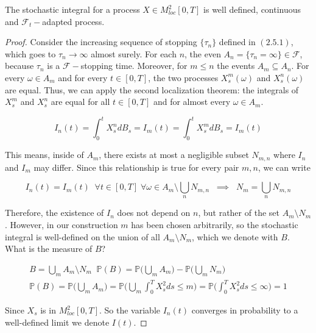 \begin{theorem}
    The stochastic integral for a process $X \in M^2_{loc}[0,T]$ is well defined, continuous and $\mathcal{F}_t-$adapted process. 
\end{theorem}
\begin{proof}
    Consider the increasing sequence of stopping $\{\tau_n \}$ defined in $(2.5.1)$, which goes to $\tau_n \to \infty$ almost surely. For each $n$, the even $A_n = \{ \tau_n = \infty \} \in \mathcal{F}$, because $\tau_n$ is a $\mathcal{F}-$stopping time. Moreover, for $m \leq n$ the events $A_m\subseteq A_n$. For every $\omega \in A_m$ and for every $t \in [0,T]$, the two processes $X_s^m(\omega)$ and $X_s^n(\omega)$ are equal. Thus, we can apply the second localization theorem: the integrals of $X_s^m$ and $X_s^n$ are equal for all $t \in [0,T]$ and for almost every $\omega \in A_m$. 

    \begin{equation*}
        I_n(t) = \int_0^t X_s^n dB_s = I_m(t) = \int_0^t X_s^m dB_s = I_m(t)
    \end{equation*}

    This means, inside of $A_m$, there exists at most a negligible subset $N_{m,n}$ where $I_n$ and $I_m$ may differ. Since this relationship is true for every pair $m,n$, we can write

    \begin{equation*}
        I_n(t) = I_m(t) \;\; \forall t \in [0,T] \; \forall \omega \in A_m \setminus \bigcup_n N_{m,n} \;\; \implies \;\; N_m = \bigcup_n N_{m,n}
    \end{equation*}

    Therefore, the existence of $I_n$ does not depend on $n$, but rather of the set $A_m \setminus N_m$. However, in our construction $m$ has been chosen arbitrarily, so the stochastic integral is well-defined on the union of all $A_m \setminus N_m$, which we denote with $B$. What is the measure of $B$?

    \begin{gather*}
        B = \bigcup_m A_m \setminus N_m \;\; \mathbb{P}(B) = \mathbb{P}\Big( \bigcup_m A_m \big) - \mathbb{P}\Big( \bigcup_m N_m \Big) \\
        \mathbb{P}(B) = \mathbb{P}\Big( \bigcup_m A_m \big) = \mathbb{P}\Big( \bigcup_m \int_0^T X_s^2 ds \leq m \Big) = \mathbb{P}\Big( \int_0^T X_s^2 ds \leq \infty \Big) = 1
    \end{gather*}

    Since $X_s$ is in $M^2_{loc}[0,T]$. So the variable $I_n(t)$ converges in probability to a well-defined limit we denote $I(t)$. 


\end{proof}
